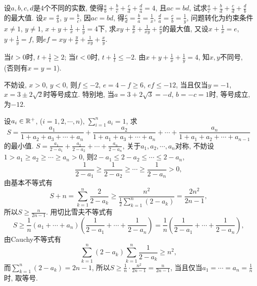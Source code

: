 \begin{center}
\end{center}
\ea

\bq{}{}
设$a,b,c,d$是$4$个不同的实数, 使得$\frac{a}{b}+\frac{b}{c}+\frac{c}{d}+\frac{d}{a}=4$,
且$ac=bd$, 试求$\frac{a}{c}+\frac{b}{d}+\frac{c}{d}+\frac{d}{b}$的最大值.
\eq
\ba
设$x=\frac{a}{b}$, $y=\frac{b}{c}$, 因$ac=bd$, 得$\frac{c}{d}=\frac{b}{a}=\frac{1}{x}$,
$\frac{d}{a}=\frac{c}{b}=\frac{1}{y}$, 问题转化为约束条件$x\ne1$, $y\ne1$,
$x+y+\frac{1}{x}+\frac{1}{y}=4$下, 求$xy+\frac{y}{x}+\frac{1}{xy}+\frac{x}{y}$的最大值,
又设$x+\frac{1}{x}=e$, $y+\frac{1}{y}=f$, 则$ef=xy+\frac{y}{x}+\frac{1}{xy}+\frac{x}{y}$.

当$t>0$时, $t+\frac{1}{t}\ge2$; 当$t<0$时, $t+\frac{1}{t}\le-2$. 由$x+y+\frac{1}{x}+\frac{1}{y}=4$,
知$x,y$不同号, (否则有$x=y=1$).

不妨设, $x>0$, $y<0$, 则$f\le-2$, $e=4-f\ge6$, $ef\le-12$, 当且仅当$y=-1$,
$x=3\pm2\sqrt{2}$时等号成立. 特别地, 当$a=3+2\sqrt{3}=-d$, $b=-c=1$时, 等号成立,
为$-12$.
\ea

\bq{}{}
设$a_{i}\in\mathbb{R}^{+}$, ($i=1,2,\cdots,n$), $\sum_{i=1}^{n}a_{i}=1$,
求
\[
S=\frac{a_{1}}{1+a_{2}+a_{3}+\cdots+a_{n}}+\frac{a_{2}}{1+a_{1}+a_{3}+\cdots+a_{n}}+\cdots+\frac{a_{n}}{1+a_{1}+a_{2}+\cdots+a_{n-1}}
\]
的最小值.
\eq
\ba
$S=\frac{a_{1}}{2-a_{1}}+\frac{a_{2}}{2-a_{2}}+\cdots+\frac{a_{n}}{2-a_{n}}$,
关于$a_{1},a_{2},\cdots,a_{n}$对称, 不妨设$1>a_{1}\ge a_{2}\ge\cdots\ge a_{n}>0$,
则$2-a_{1}\le2-a_{2}\le\cdots\le2-a_{n}$,
\[
\frac{1}{2-a_{1}}\ge\frac{1}{2-a_{2}}\ge\cdots\ge\frac{1}{2-a_{n}}>0,
\]
由基本不等式有
\[
S+n=\sum_{k=1}^{n}\frac{2}{2-a_{k}}\ge\frac{n^{2}}{\frac{1}{2}\sum_{k=1}^{n}\left(2-a_{k}\right)}=\frac{2n^{2}}{2n-1},
\]
所以$S\ge\frac{n}{2n-1}$.
\ea
\ba
用切比雪夫不等式有
\[
S\ge\frac{1}{n}\left(a_{1}+\cdots+a_{n}\right)\left(\frac{1}{2-a_{1}}+\cdots+\frac{1}{2-a_{n}}\right)=\frac{1}{n}\left(\frac{1}{2-a_{1}}+\cdots+\frac{1}{2-a_{n}}\right),
\]
由Cauchy不等式有
\[
\sum_{k=1}^{n}\left(2-a_{k}\right)\sum_{k=1}^{n}\frac{1}{2-a_{k}}\ge n^{2},
\]
而$\sum_{k=1}^{n}\left(2-a_{k}\right)=2n-1$, 所以$S\ge\frac{1}{n}\cdot\frac{n^{2}}{2n-1}=\frac{n}{2n-1}$,
当且仅当$a_{1}=\cdots=a_{n}=\frac{1}{n}$时, 取等号.
\ea

